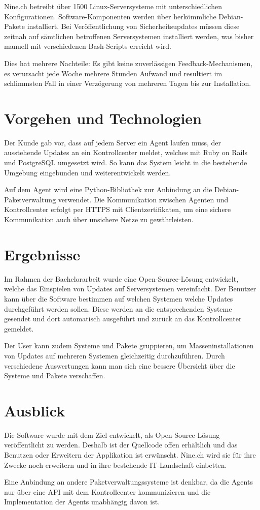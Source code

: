 Nine.ch betreibt über 1500 Linux-Serversysteme mit unterschiedlichen Konfigurationen. Software-Komponenten werden über herkömmliche Debian-Pakete installiert. Bei Veröffentlichung von Sicherheitsupdates müssen diese zeitnah auf sämtlichen betroffenen Serversystemen installiert werden, was bisher manuell mit verschiedenen Bash-Scripts erreicht wird.

Dies hat mehrere Nachteile: Es gibt keine zuverlässigen Feedback-Mechanismen, es verursacht jede Woche mehrere Stunden Aufwand und resultiert im schlimmsten Fall in einer Verzögerung von mehreren Tagen bis zur Installation.

\section*{Vorgehen und Technologien}

Der Kunde gab vor, dass auf jedem Server ein Agent laufen muss, der ausstehende Updates an ein Kontrollcenter meldet, welches mit Ruby on Rails und PostgreSQL umgesetzt wird. So kann das System leicht in die bestehende Umgebung eingebunden und weiterentwickelt werden. 

Auf dem Agent wird eine Python-Bibliothek zur Anbindung an die Debian-Paketverwaltung verwendet. Die Kommunikation zwischen Agenten und Kontrollcenter erfolgt per HTTPS mit Clientzertifikaten, um eine sichere Kommunikation auch über unsichere Netze zu gewährleisten.

\section*{Ergebnisse}   

Im Rahmen der Bachelorarbeit wurde eine Open-Source-Lösung entwickelt, welche das Einspielen von Updates auf Serversystemen vereinfacht. Der Benutzer kann über die Software bestimmen auf welchen Systemen welche Updates durchgeführt werden sollen. Diese werden an die entsprechenden Systeme gesendet und dort automatisch ausgeführt und zurück an das Kontrollcenter gemeldet.


Der User kann zudem Systeme und Pakete gruppieren, um Masseninstallationen von Updates auf mehreren Systemen gleichzeitig durchzuführen. Durch verschiedene Auswertungen kann man sich eine bessere Übersicht über die Systeme und Pakete verschaffen.

\section*{Ausblick}

Die Software wurde mit dem Ziel entwickelt, als Open-Source-Lösung veröffentlicht zu werden. Deshalb ist der Quellcode offen erhältlich und das Benutzen oder Erweitern der Applikation ist erwünscht. Nine.ch wird sie für ihre Zwecke noch erweitern und in ihre bestehende IT-Landschaft einbetten.

Eine Anbindung an andere Paketverwaltungssysteme ist denkbar, da die Agents nur über eine API mit dem Kontrollcenter kommunizieren und die Implementation der Agents unabhängig davon ist.
